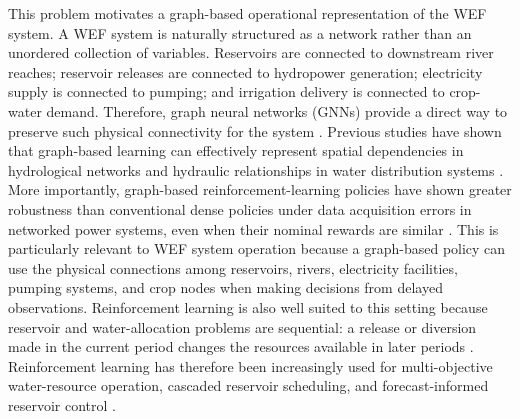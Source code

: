 \documentclass [a4paper,fleqn] {cas-dc}
\begin{document}
This problem motivates a graph-based operational representation of the WEF system. A WEF system is naturally structured as a network rather than an unordered collection of variables. Reservoirs are connected to downstream river reaches; reservoir releases are connected to hydropower generation; electricity supply is connected to pumping; and irrigation delivery is connected to crop-water demand. Therefore, graph neural networks (GNNs) provide a direct way to preserve such physical connectivity for the system \citep{velickovic2018,jiang2020,niu2021,mei2026}. Previous studies have shown that graph-based learning can effectively represent spatial dependencies in hydrological networks \citep{Sun2021HydrologyGNN} and hydraulic relationships in water distribution systems \citep{Truong2024WDNGNN}. More importantly, graph-based reinforcement-learning policies have shown greater robustness than conventional dense policies under data acquisition errors in networked power systems, even when their nominal rewards are similar \citep{Lee2022GraphPolicyVoltVar}. This is particularly relevant to WEF system operation because a graph-based policy can use the physical connections among reservoirs, rivers, electricity facilities, pumping systems, and crop nodes when making decisions from delayed observations. Reinforcement learning is also well suited to this setting because reservoir and water-allocation problems are sequential: a release or diversion made in the current period changes the resources available in later periods \citep{haarnoja2018}. Reinforcement learning has therefore been increasingly used for multi-objective water-resource operation, cascaded reservoir scheduling, and forecast-informed reservoir control \citep{Castelletti2013MultiobjectiveRL,Xu2020CascadedReservoirDRL,Zanutto2025ForecastRL,Wu2024TransformerDRLReservoir,Xie2026LongHorizonReservoirDRL,hooshyar2020}.

\end{document}
